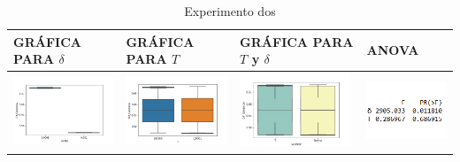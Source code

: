 \begin{table}[H]
\caption{Experimento dos}
\centering
\begin{tabular}[c]{llll}
\multicolumn{1}{p{2.9cm}}{\textbf{GRÁFICA PARA $\delta$}} & \multicolumn{1}{p{2.9cm}}{\textbf{GRÁFICA PARA $T$}} & \multicolumn{1}{p{2.9cm}}{\textbf{GRÁFICA PARA $T$ y $\delta$}} & \multicolumn{1}{p{2.9cm}}{\textbf{ANOVA}}  \\ \hline
\multicolumn{1}{|l|}{\includegraphics[align=t, width=33mm]{cajasDeltha_exp21.jpg}}    & \multicolumn{1}{l|}{\includegraphics[align=t, width=33mm]{cajasT1_exp21.jpg} } & \multicolumn{1}{l|}{\includegraphics[align=t, width=33mm]{cajasT_Deltha_exp21.jpg} } &
\multicolumn{1}{p{3cm}|}{\includegraphics[align=t, width=30mm]{Anova21.png}}     \\ \hline

\end{tabular}
\end{table}
